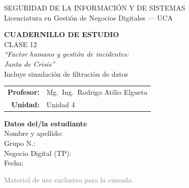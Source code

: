 \documentclass[12pt,a4paper]{article}
\begin{document}
\begin{titlepage}
\centering
\vspace*{1cm}

\begin{cajaTitulo}[width=\textwidth, halign=center]
  SEGURIDAD DE LA INFORMACI\'ON Y DE SISTEMAS\\[4pt]
  {\large Licenciatura en Gesti\'on de Negocios Digitales --- UCA}
\end{cajaTitulo}

\vspace{1.5cm}

{\Huge\bfseries\color{azulUCA} CUADERNILLO DE ESTUDIO}\\[8pt]
{\LARGE\color{doradoUCA} CLASE 12}\\[12pt]
{\Large\itshape ``Factor humano y gesti\'on de incidentes:\\[2pt] Junta de Crisis''}\\[6pt]
{\large\color{rojoCrisis}\; Incluye simulaci\'on de filtraci\'on de datos}\\[1.5cm]

\begin{tabular}{rl}
\textbf{Profesor:}   & Mg.\ Ing.\ Rodrigo Atilio Elgueta \\[4pt]
\textbf{Unidad:}     & Unidad 4 \\[4pt]
\end{tabular}

\vfill

\begin{tcolorbox}[colback=grisClaro, colframe=azulUCA, arc=3mm, width=0.9\textwidth]
  \centering
  {\bfseries Datos del/la estudiante}\\[10pt]
  Nombre y apellido: \underline{\hspace{5cm}}\\[10pt]
  Grupo N.\textdegree: \underline{\hspace{5cm}}\\[10pt]
  Negocio Digital (TP): \underline{\hspace{5cm}}\\[10pt]
  Fecha: \underline{\hspace{5cm}}
\end{tcolorbox}

\vspace{1cm}
{\small\textcolor{gray}{Material de uso exclusivo para la cursada.}}
\end{titlepage}
\end{document}
